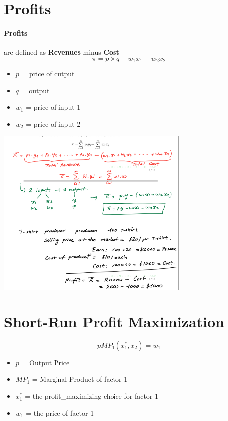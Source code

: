 \documentclass{report}
\begin{document}
\section{Profits}
\begin{defbox}
\paragraph{Profits}
are defined as \textbf{Revenues} minus \textbf{Cost}
$$\pi = p\times q-w_1x_1-w_2x_2$$
\begin{itemize}
\item $p$ = price of output
\item $q$ = output
\item $w_1$ = price of input 1
\item $w_2$ = price of input 2
\end{itemize}
\end{defbox}
\includegraphics[width = 0.7\textwidth]{econ9}
\section{Short-Run Profit Maximization}
\begin{defbox}
$$pMP_1(x_1^*,x_2)=w_1$$

\begin{itemize}
\item $p$ = Output Price
\item $MP_1$ = Marginal Product of factor 1
\item $x_1^*$ = the profit\_maximizing choice for factor 1
\item $w_1$ = the price of factor 1
\end{itemize}

\end{defbox}
\end{document}
